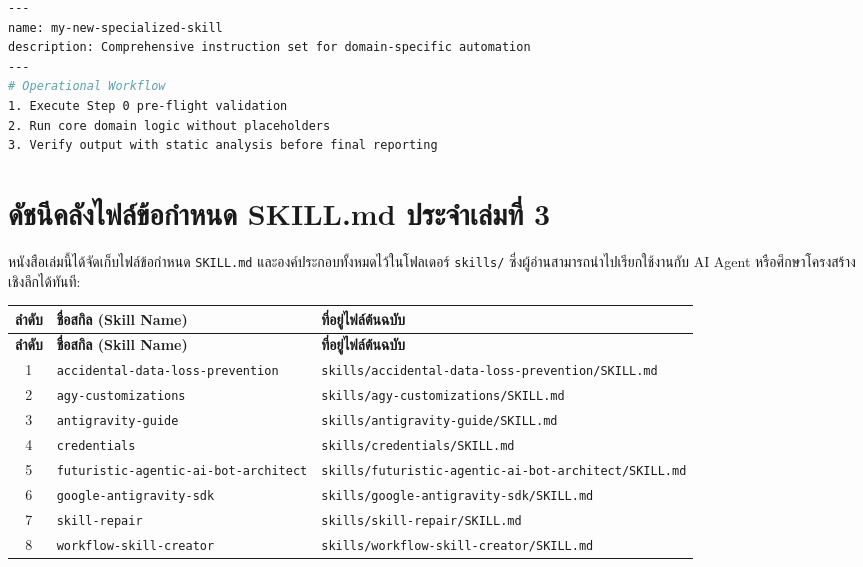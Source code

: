 \begin{lstlisting}[language=bash, caption={Master SKILL.md Blueprint}]
---
name: my-new-specialized-skill
description: Comprehensive instruction set for domain-specific automation
---
# Operational Workflow
1. Execute Step 0 pre-flight validation
2. Run core domain logic without placeholders
3. Verify output with static analysis before final reporting
\end{lstlisting}


\section{ดัชนีคลังไฟล์ข้อกำหนด SKILL.md ประจำเล่มที่ 3}

หนังสือเล่มนี้ได้จัดเก็บไฟล์ข้อกำหนด \texttt{SKILL.md} และองค์ประกอบทั้งหมดไว้ในโฟลเดอร์ \texttt{skills/} ซึ่งผู้อ่านสามารถนำไปเรียกใช้งานกับ AI Agent หรือศึกษาโครงสร้างเชิงลึกได้ทันที:

\small
\begin{longtable}{|c|p{}|p{}|}
\hline
\textbf{ลำดับ} & \textbf{ชื่อสกิล (Skill Name)} & \textbf{ที่อยู่ไฟล์ต้นฉบับ} \\ \hline
\endfirsthead
\hline
\textbf{ลำดับ} & \textbf{ชื่อสกิล (Skill Name)} & \textbf{ที่อยู่ไฟล์ต้นฉบับ} \\ \hline
\endhead
1 & \texttt{accidental-data-loss-prevention} & \texttt{skills/accidental-data-loss-prevention/SKILL.md} \\ \hline
2 & \texttt{agy-customizations} & \texttt{skills/agy-customizations/SKILL.md} \\ \hline
3 & \texttt{antigravity-guide} & \texttt{skills/antigravity-guide/SKILL.md} \\ \hline
4 & \texttt{credentials} & \texttt{skills/credentials/SKILL.md} \\ \hline
5 & \texttt{futuristic-agentic-ai-bot-architect} & \texttt{skills/futuristic-agentic-ai-bot-architect/SKILL.md} \\ \hline
6 & \texttt{google-antigravity-sdk} & \texttt{skills/google-antigravity-sdk/SKILL.md} \\ \hline
7 & \texttt{skill-repair} & \texttt{skills/skill-repair/SKILL.md} \\ \hline
8 & \texttt{workflow-skill-creator} & \texttt{skills/workflow-skill-creator/SKILL.md} \\ \hline
\end{longtable}
\normalsize
